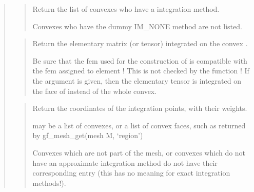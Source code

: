 \documentclass[a4paper,11pt,english]{sphinxmanual}
\begin{document}
\begin{quote}
\sphinxAtStartPar
{}
\begin{quote}

\sphinxAtStartPar
Return the list of convexes who have a integration method.

\sphinxAtStartPar
Convexes who have the dummy IM\_NONE method are not listed.
\end{quote}

\sphinxAtStartPar
{}
\begin{quote}

\sphinxAtStartPar
Return the elementary matrix (or tensor) integrated on the convex .

\sphinxAtStartPar
{}

\sphinxAtStartPar
Be sure that the fem used for the construction of  is compatible
with the fem assigned to element  ! This is not checked by the
function ! If the argument  is given, then the elementary tensor
is integrated on the face  of  instead of the whole convex.
\end{quote}

\sphinxAtStartPar
{}
\begin{quote}

\sphinxAtStartPar
Return the coordinates of the integration points, with their weights.

\sphinxAtStartPar
{} may be a list of convexes, or a list of convex faces, such
as returned by gf\_mesh\_get(mesh M, ‘region’)

\sphinxAtStartPar
{}

\sphinxAtStartPar
Convexes which are not part of the mesh, or convexes which
do not have an approximate integration method do not have
their corresponding entry (this has no meaning for exact
integration methods!).
\end{quote}

\sphinxAtStartPar
{}
\begin{quote}


\end{quote}
\end{quote}
\end{document}
